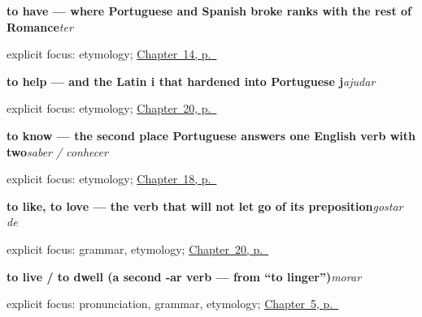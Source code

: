 \noindent\begin{minipage}[t]{\linewidth}
\raggedright
\textbf{to have — where Portuguese and Spanish broke ranks with the rest of Romance}\enspace\emph{ter}\par
\footnotesize explicit focus: etymology; \hyperref[ch:pt-having-and-age]{Chapter~14, p.~\pageref*{ch:pt-having-and-age}}
\end{minipage}\par\smallskip

\noindent\begin{minipage}[t]{\linewidth}
\raggedright
\textbf{to help — and the Latin i that hardened into Portuguese j}\enspace\emph{ajudar}\par
\footnotesize explicit focus: etymology; \hyperref[ch:pt-taking-asking-helping-liking]{Chapter~20, p.~\pageref*{ch:pt-taking-asking-helping-liking}}
\end{minipage}\par\smallskip

\noindent\begin{minipage}[t]{\linewidth}
\raggedright
\textbf{to know — the second place Portuguese answers one English verb with two}\enspace\emph{saber / conhecer}\par
\footnotesize explicit focus: etymology; \hyperref[ch:pt-core-verbs]{Chapter~18, p.~\pageref*{ch:pt-core-verbs}}
\end{minipage}\par\smallskip

\noindent\begin{minipage}[t]{\linewidth}
\raggedright
\textbf{to like, to love — the verb that will not let go of its preposition}\enspace\emph{gostar de}\par
\footnotesize explicit focus: grammar, etymology; \hyperref[ch:pt-taking-asking-helping-liking]{Chapter~20, p.~\pageref*{ch:pt-taking-asking-helping-liking}}
\end{minipage}\par\smallskip

\noindent\begin{minipage}[t]{\linewidth}
\raggedright
\textbf{to live / to dwell (a second -ar verb — from \textquotedblleft{}to linger\textquotedblright{})}\enspace\emph{morar}\par
\footnotesize explicit focus: pronunciation, grammar, etymology; \hyperref[ch:pt-first-verbs]{Chapter~5, p.~\pageref*{ch:pt-first-verbs}}
\end{minipage}\par\smallskip

